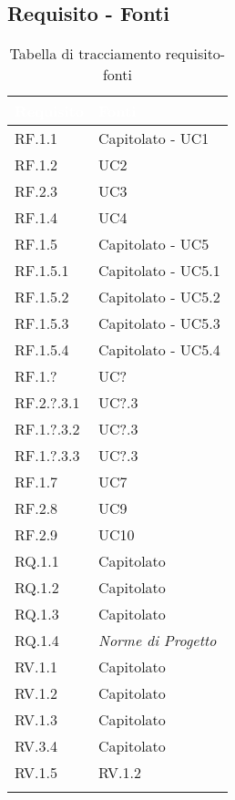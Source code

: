 \subsection{Requisito - Fonti}
\begin{center}
  \centering
  \begin{longtable}{|C{6cm}|C{6cm}|}
    \hline
    \textcolor[HTML]{FFFFFF}{\textbf{Requisito}} & \textcolor[HTML]{FFFFFF}{\textbf{Fonti}} \\ \hline
    RF.1.1 & Capitolato - UC1 \\ \hline
    RF.1.2 & UC2 \\ \hline
    RF.2.3 & UC3 \\ \hline
    RF.1.4 & UC4 \\ \hline
    RF.1.5 & Capitolato - UC5 \\ \hline
    RF.1.5.1 & Capitolato - UC5.1 \\ \hline
    RF.1.5.2 & Capitolato - UC5.2 \\ \hline
    RF.1.5.3 & Capitolato - UC5.3 \\ \hline
    RF.1.5.4 & Capitolato - UC5.4 \\ \hline
    RF.1.? & UC? \\ \hline
    RF.2.?.3.1 & UC?.3 \\ \hline
    RF.1.?.3.2 & UC?.3 \\ \hline
    RF.1.?.3.3 & UC?.3 \\ \hline
    RF.1.7 & UC7 \\ \hline
    RF.2.8 & UC9 \\ \hline
    RF.2.9 & UC10 \\ \hline
    RQ.1.1 & Capitolato \\ \hline
    RQ.1.2 & Capitolato \\ \hline
    RQ.1.3 & Capitolato \\ \hline
    RQ.1.4 & \textit{Norme di Progetto} \\ \hline
    RV.1.1 & Capitolato \\ \hline
    RV.1.2 & Capitolato \\ \hline
    RV.1.3 & Capitolato \\ \hline
    RV.3.4 & Capitolato \\ \hline
    RV.1.5 & RV.1.2 \\ \hline

    \caption{Tabella di tracciamento requisito-fonti}
  \end{longtable}
\end{center}


